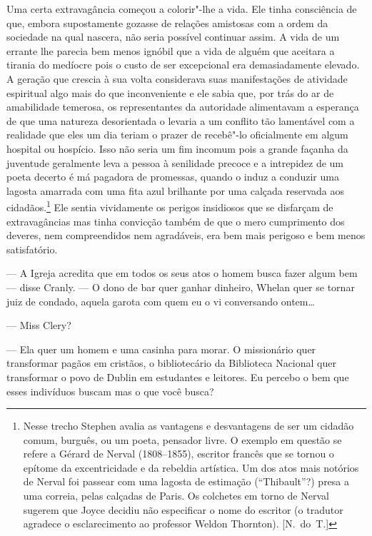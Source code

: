 Uma certa extravagância começou a colorir"-lhe a vida.  Ele tinha consciência de
que, embora supostamente gozasse de relações amistosas com a ordem da sociedade
na qual nascera, não seria possível continuar assim.  A vida de um errante lhe
parecia bem menos ignóbil que a vida de alguém que aceitara a tirania do
medíocre pois o custo de ser excepcional era demasiadamente elevado.  A geração
que crescia à sua volta considerava suas manifestações de atividade espiritual
algo mais do que inconveniente e ele sabia que, por trás do ar de amabilidade
temerosa, os representantes da autoridade alimentavam a esperança de que uma
natureza desorientada o levaria a um conflito tão lamentável com a realidade
que eles um dia teriam o prazer de recebê"-lo oficialmente em algum hospital ou
hospício.  Isso não seria um fim incomum pois a grande façanha da juventude
geralmente leva a pessoa à senilidade precoce e a intrepidez de um
poeta decerto é má pagadora de promessas, quando o induz a
conduzir uma lagosta amarrada com uma fita azul brilhante por uma calçada
reservada aos cidadãos.\footnote{ Nesse trecho Stephen avalia as vantagens e
desvantagens de ser um cidadão comum, burguês, ou um poeta, pensador livre.  O
exemplo em questão se refere a Gérard de Nerval (1808--1855), escritor francês 
que se tornou o epítome da excentricidade e da rebeldia artística.  Um
dos atos mais notórios de Nerval foi passear com uma lagosta de estimação
(“Thibault”?) presa a uma correia, pelas calçadas de Paris.  Os colchetes em torno de Nerval
sugerem que Joyce decidiu não especificar o nome do escritor (o tradutor agradece
o esclarecimento ao professor Weldon Thornton). [N.~do~T.]}   Ele sentia
vividamente os perigos insidiosos que se disfarçam de extravagâncias mas tinha
convicção também de que o mero cumprimento dos deveres, nem compreendidos nem
agradáveis, era bem mais perigoso e bem menos satisfatório.

--- A Igreja acredita que em todos os seus atos o homem busca fazer algum bem
--- disse Cranly. --- O dono de bar quer ganhar dinheiro, Whelan quer se tornar
juiz de condado, aquela garota com quem eu o vi conversando ontem\ldots{}

--- Miss Clery?

--- Ela quer um homem e uma casinha para morar.  O missionário quer transformar
pagãos em cristãos, o bibliotecário da Biblioteca Nacional quer transformar o
povo de Dublin em estudantes e leitores. Eu percebo o bem que esses
indivíduos buscam mas o que você busca?

